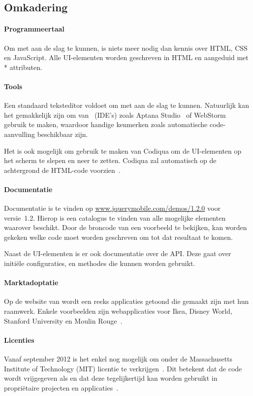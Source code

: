 \subsection{Omkadering}
\paragraph{Programmeertaal}
Om met \jqm{} aan de slag te kunnen, is niets meer nodig dan kennis over HTML, CSS en JavaScript. 
Alle UI-elementen worden geschreven in HTML en aangeduid met * attributen.

\paragraph{Tools}
Een standaard teksteditor voldoet om met \jqm{} aan de slag te kunnen. 
Natuurlijk kan het gemakkelijk zijn om van ~(IDE's) zoals Aptana Studio~\cite{Aptana2012} of WebStorm~\cite{JetBrains2012} gebruik te maken, waardoor handige kenmerken zoals automatische code-aanvulling beschikbaar zijn.

Het is ook mogelijk om gebruik te maken van Codiqua om de UI-elementen op het scherm te slepen en neer te zetten. 
Codiqua zal automatisch op de achtergrond de HTML-code voorzien~\cite{Sperry2012}.

\paragraph{Documentatie}
Documentatie is te vinden op \url{www.jquerymobile.com/demos/1.2.0} voor versie~1.2. 
Hierop is een catalogus te vinden van alle mogelijke elementen waarover \jqm{} beschikt. 
Door de broncode van een voorbeeld te bekijken, kan worden gekeken welke code moet worden geschreven om tot dat resultaat te komen.

Naast de UI-elementen is er ook documentatie over de API. 
Deze gaat over initiële configuraties,  en methodes die kunnen worden gebruikt.

\paragraph{Marktadoptatie}
Op de website van \jqm{} wordt een reeks applicaties getoond die gemaakt zijn met hun raamwerk. 
Enkele voorbeelden zijn webapplicaties voor Ikea, Disney World, Stanford University en Moulin Rouge~\cite{JQuery2012a}. 

\paragraph{Licenties}
Vanaf september 2012 is het enkel nog mogelijk om \jqm{} onder de Massachusetts Institute of Technology (MIT) licentie te verkrijgen~\cite{Dmethvin2012}. 
Dit betekent dat de code wordt vrijgegeven als  en dat deze tegelijkertijd kan worden gebruikt in propriëtaire projecten en applicaties~\cite{PhilDutson2012}.

